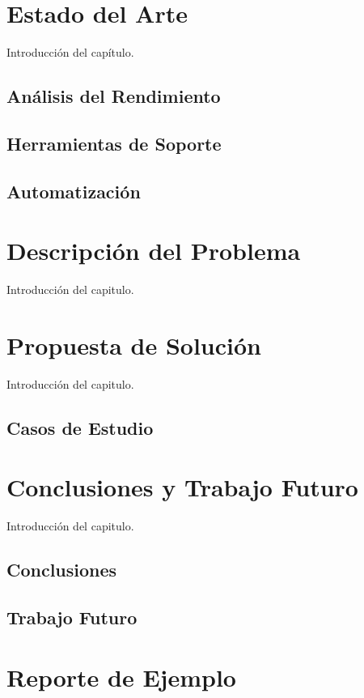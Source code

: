 \documentclass[a4paper]{report}
\begin{document}
\chapter{Estado del Arte}

Introducción del capítulo.

\section{Análisis del Rendimiento}

\section{Herramientas de Soporte}

\section{Automatización}

\chapter{Descripción del Problema}

Introducción del capitulo.

\chapter{Propuesta de Solución}

Introducción del capitulo.

\section{Casos de Estudio}

\chapter{Conclusiones y Trabajo Futuro}

Introducción del capitulo.

\section{Conclusiones}

\section{Trabajo Futuro}



\appendix

\chapter{Reporte de Ejemplo}
\end{document}

